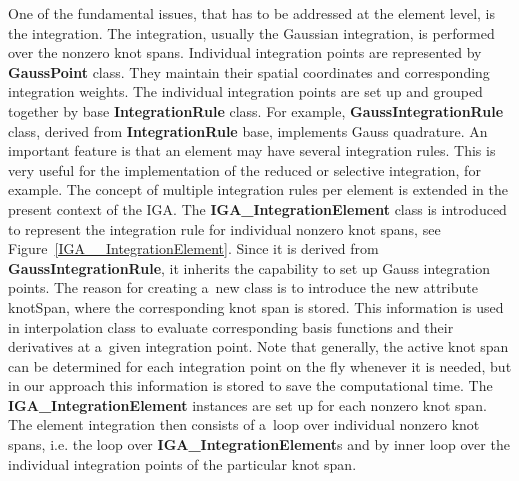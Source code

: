 \documentclass[a4paper]{article}
\newcommand{\class}[1]{{\bf #1}}
\newcommand{\attribute}[1]{#1}
\begin{document}
One of the fundamental issues, that has to be addressed at the element
level, is the integration. The integration, usually the Gaussian
integration, is performed over the nonzero knot spans. Individual
integration points are represented 
by \class{GaussPoint} class. They maintain their spatial
coordinates and corresponding integration weights. The individual
integration points are set up and grouped together by base
\class{IntegrationRule} class. For example,
\class{GaussIntegrationRule} class, derived from
\class{IntegrationRule} base, implements Gauss quadrature. An
important feature is that an element may have several integration
rules. This is very useful for the implementation of the reduced or selective
integration, for example. The concept of multiple integration rules
per element is extended in the present context of the IGA. The
\class{IGA\_IntegrationElement} class is introduced to represent the
integration rule for individual nonzero knot spans, see
Figure~\ref{IGA__IntegrationElement}. Since it is derived from
\class{GaussIntegrationRule}, it inherits the capability to set up
Gauss integration points. The reason for creating a~new class is to
introduce the new attribute \attribute{knotSpan}, where the
corresponding  knot span is stored. This information is used in
interpolation class to evaluate corresponding basis functions and
their derivatives at a~given integration point. Note that generally, the
active knot span can be determined for each integration point on the
fly whenever it is needed, but in our approach this information is stored to save
the computational time. The \class{IGA\_IntegrationElement} instances
are set up for each nonzero knot span. The element integration then
consists of a~loop over individual nonzero knot spans, i.e. the loop over
\class{IGA\_IntegrationElement}s and by inner loop over the individual
integration points of the particular knot span.
\end{document}
